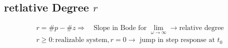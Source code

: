 \subsection{retlative Degree $r$}
\vspace*{-1em}
    \begin{align*}
        r = \# p - \# z \Rightarrow \quad \text{Slope in Bode for }\lim\limits_{\omega \rightarrow \infty} \rightarrow \text{relative degree}\\
        r \geq 0: \text{realizable system}, r = 0 \rightarrow \text{ jump in step response at } t_0
    \end{align*}